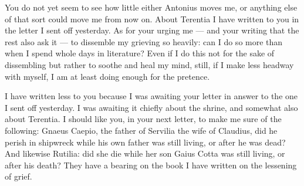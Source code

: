 

 You do not yet seem to see how little either Antonius moves me, or anything else of that sort could move me from now on. About Terentia I have written to you in the letter I sent off yesterday. As for your urging me --- and your writing that the rest also ask it --- to dissemble my grieving so heavily: can I do so more than when I spend whole days in literature? Even if I do this not for the sake of dissembling but rather to soothe and heal my mind, still, if I make less headway with myself, I am at least doing enough for the pretence.

 I have written less to you because I was awaiting your letter in answer to the one I sent off yesterday. I was awaiting it chiefly about the shrine, and somewhat also about Terentia. I should like you, in your next letter, to make me sure of the following: Gnaeus Caepio, the father of Servilia the wife of Claudius, did he perish in shipwreck while his own father was still living, or after he was dead? And likewise Rutilia: did she die while her son Gaius Cotta was still living, or after his death? They have a bearing on the book I have written on the lessening of grief.
